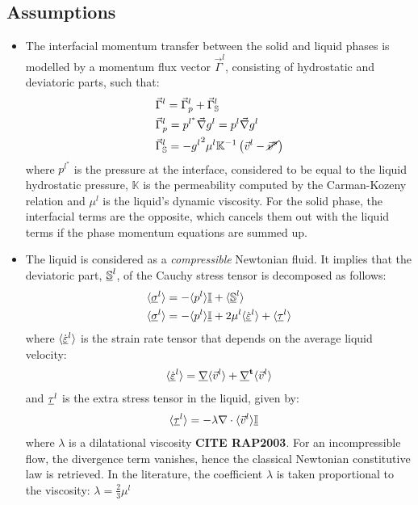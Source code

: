 \subsection{Assumptions}
\begin{itemize}
\item The interfacial momentum transfer between the solid and liquid phases is modelled 
by a momentum flux vector $\vec{\Gamma}^{l}$, consisting of hydrostatic and deviatoric 
parts, such that:
\begin{subequations}
\begin{align}
\label{eq:eq_interfacial_momentum_init}
		& \vec{\Gamma}^{l} =  \vec{\Gamma}_{p}^{l} + \vec{\Gamma}_{\mathbb{S}}^{l}						\\
		& \vec{\Gamma}_{p}^{l} = p^{l^{*}} \vec{\nabla} g^{l} = p^{l} \vec{\nabla} g^{l}			  \\
		& \vec{\Gamma}_{\mathbb{S}}^{l} = -{g^{l}}^{2} \mu^{l} \mathbb{K}^{-1} \left(  \vec{v}^l - \cancel{\vec{v}^s}  \right)  
\end{align}
\end{subequations}
where $p^{l^{*}}$ is the pressure at the interface, considered to be equal to the liquid hydrostatic 
pressure, $\mathbb{K}$ is the permeability computed by the Carman-Kozeny relation and $\mu^l$ is the 
liquid's dynamic viscosity.  For the solid phase, the interfacial terms are the opposite, which cancels 
them out with the liquid terms if the phase momentum equations are summed up.
\item The liquid is considered as a \emph{compressible} Newtonian fluid. It implies that the deviatoric part, $\underline{\mathbb{S}}^{l} $, of the Cauchy 
stress tensor is decomposed as follows: 
\begin{subequations} 
\begin{align}
\label{eq:stress_liq}
& \langle  \underline{\sigma}^{l}  \rangle = - \langle p^l \rangle \underline{\mathbb{I}} + \langle \underline{\mathbb{S}}^{l} \rangle   \\
& \langle  \underline{\sigma}^{l}  \rangle = - \langle p^l \rangle \underline{\mathbb{I}} + 2\mu^{l} \langle {\dot{\ensuremath{\underline{\varepsilon}}}}^l \rangle + \langle \underline{\tau}^l \rangle
\end{align}
\end{subequations}
where $ \langle {\dot{\ensuremath{\underline{\varepsilon}}}}^l \rangle $ is the strain rate tensor that depends on the average liquid velocity: 
\begin{align}
\label{eq:tensor_strainrate}
\langle {\dot{\ensuremath{\underline{\varepsilon}}}}^l \rangle = \underline{\nabla} \langle \vec{v}^l \rangle  +  \underline{\nabla}^\text{\textbf{t}} \langle \vec{v}^l \rangle 
\end{align}
and  $\underline{\tau}^{l}$ is the extra stress tensor in the liquid, given by:
\begin{subequations}
\begin{align}
\label{eq:tensor_extrastress}
 & \langle \underline{\tau}^l \rangle =  -\lambda \nabla \cdot \langle \vec{v}^l \rangle  \underline{\mathbb{I}} 
\end{align}
\end{subequations}
where $\lambda$ is a dilatational viscosity \textbf{CITE RAP2003}. For an incompressible flow, the divergence term vanishes, hence the classical Newtonian constitutive law is retrieved. In the literature, the coefficient $\lambda$ is taken proportional to the viscosity: $\lambda = \frac{2}{3} \mu^l $
\end{itemize}
